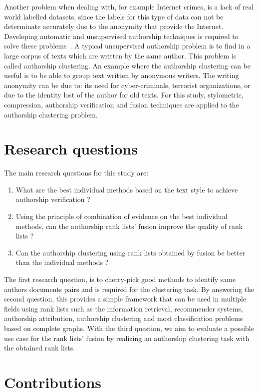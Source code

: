 Another problem when dealing with, for example Internet crimes, is a lack of real world labelled datasets, since the labels for this type of data can not be determinate accurately due to the anonymity that provide the Internet.
Developing automatic and unsupervised authorship techniques is required to solve these problems~\cite{automated_unsupervised}.
A typical unsupervised authorship problem is to find in a large corpus of texts which are written by the same author.
This problem is called authorship clustering.
An example where the authorship clustering can be useful is to be able to group text written by anonymous writers.
The writing anonymity can be due to: its need for cyber-criminals, terrorist organizations, or due to the identity lost of the author for old texts.
For this study, stylometric, compression, authorship verification and fusion techniques are applied to the authorship clustering problem.

\section{Research questions}

The main research questions for this study are:

\begin{enumerate}
  \item
  What are the best individual methods based on the text style to achieve authorship verification ?
  \item
  Using the principle of combination of evidence on the best individual methods, can the authorship rank lists' fusion improve the quality of rank lists ?
  \item
  Can the authorship clustering using rank lists obtained by fusion be better than the individual methods ?
\end{enumerate}

The first research question, is to cherry-pick good methods to identify same authors documents pairs and is required for the clustering task.
By answering the second question, this provides a simple framework that can be used in multiple fields using rank lists such as the information retrieval, recommender systems, authorship attribution, authorship clustering and most classification problems based on complete graphs.
With the third question, we aim to evaluate a possible use case for the rank lists' fusion by realizing an authorship clustering task with the obtained rank lists.

\section{Contributions}


